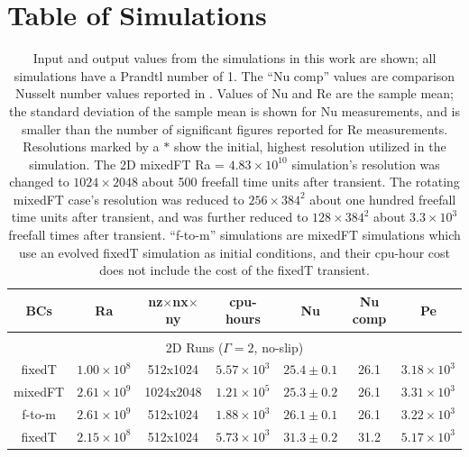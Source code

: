 \documentclass[aps, pre, onecolumn, nofootinbib, notitlepage, groupedaddress, amsfonts, amssymb, amsmath, longbibliography, superscriptaddress]{revtex4-1}
\begin{document}


\appendix
\section{Table of Simulations}
\label{app:table}


\begin{table}[ht]
\caption{
	Input and output values from the simulations in this work are shown; all simulations have a Prandtl number of 1.
	The ``Nu comp'' values are comparison Nusselt number values reported in \cite{zhu&all2018}.
	Values of Nu and Re are the sample mean; the standard deviation of the sample mean is shown for Nu measurements, and is smaller than the number of significant figures reported for Re measurements.
	Resolutions marked by a $*$ show the initial, highest resolution utilized in the simulation.
	The 2D mixedFT Ra = $4.83 \times 10^{10}$ simulation's resolution was changed to $1024\times2048$ about 500 freefall time units after transient.
	The rotating mixedFT case's resolution was reduced to $256\times384^2$ about one hundred freefall time units after transient, and was further reduced to $128\times384^2$ about $3.3\times 10^3$ freefall times after transient.
	``f-to-m'' simulations are mixedFT simulations which use an evolved fixedT simulation as initial conditions, and their cpu-hour cost does not include the cost of the fixedT transient.
}
\setlength{\tabcolsep}{12pt}
\label{table:speed}
\begin{center}
\begin{tabularx}{\textwidth}{c c c c c c c}
\hline																	
BCs	&	Ra	&	nz$\times$nx$\times$ny	&	cpu-hours &	Nu	&	Nu comp	&	Pe \\
\hline \hline \multicolumn{6}{c}{\vspace{-0.2cm}}\\
\multicolumn{7}{c}{\vspace{0.1cm}2D Runs ($\Gamma = 2$, no-slip)} \\
\hline
fixedT	&	$1.00 \times 10^8$		&	512x1024	&	$5.57 \times 10^3$	&	$25.4 \pm 0.1$	&	26.1	&	$3.18 \times 10^3$ \\
mixedFT	&	$2.61 \times 10^9$		&	1024x2048	&	$1.21 \times 10^5$	&	$25.3 \pm 0.2$	&	26.1	&	$3.31 \times 10^3$ \\
f-to-m	&	$2.61 \times 10^9$		&	512x1024	&	$1.88 \times 10^3$	&	$26.1 \pm 0.1$	&	26.1	&	$3.22 \times 10^3$ \\
fixedT	&	$2.15 \times 10^8$		&	512x1024	&	$5.73 \times 10^3$	&	$31.3 \pm 0.2$	&	31.2	&	$5.17 \times 10^3$ \\

\end{tabularx}
\end{center}
\end{table}
\end{document}
